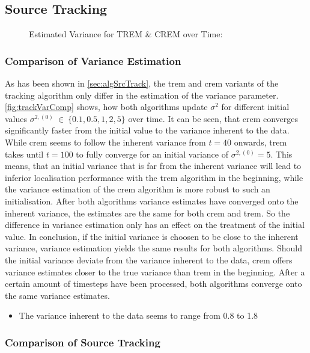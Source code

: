\subsection{Source Tracking}

\begin{figure}[H]
    \setlength\figureheight{4cm}
    
    \caption[Estimated Variance for TREM \& CREM over Time]{Estimated Variance for TREM \& CREM over Time: \itshape }
    \label{fig:trackVarComp}
\end{figure}

\subsubsection{Comparison of Variance Estimation}
As has been shown in \autoref{sec:algSrcTrack}, the \gls{trem} and \gls{crem} variants of the tracking algorithm only differ in the estimation of the variance parameter. \autoref{fig:trackVarComp} shows, how both algorithms update $\sigma^2$ for different initial values $\sigma^{2,(0)}\ \in\ \{0.1, 0.5, 1, 2, 5\}$ over time. It can be seen, that \gls{crem} converges significantly faster from the initial value to the variance inherent to the data. While \gls{crem} seems to follow the inherent variance from $t=40$ onwards, \gls{trem} takes until $t=100$ to fully converge for an initial variance of $\sigma^{2,(0)}=5$. This means, that an initial variance that is far from the inherent variance will lead to inferior localisation performance with the \gls{trem} algorithm in the beginning, while the variance estimation of the \gls{crem} algorithm is more robust to such an initialisation. After both algorithms variance estimates have converged onto the inherent variance, the estimates are the same for both \gls{crem} and \gls{trem}. So the difference in variance estimation only has an effect on the treatment of the initial value. In conclusion, if the initial variance is choosen to be close to the inherent variance, variance estimation yields the same results for both algorithms. Should the initial variance deviate from the variance inherent to the data, \gls{crem} offers variance estimates closer to the true variance than \gls{trem} in the beginning. After a certain amount of timesteps have been processed, both algorithms converge onto the same variance estimates.

\begin{itemize}
    \item The variance inherent to the data seems to range from 0.8 to 1.8
\end{itemize}

\subsubsection{Comparison of Source Tracking}
